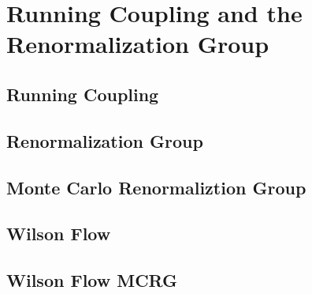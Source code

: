 \chapter{Running Coupling and the Renormalization Group}
\label{ch:theory}

  \section{Running Coupling}
  \label{sec:rc}
  

  \section{Renormalization Group}
  \label{sec:rg}
  

  \section{Monte Carlo Renormaliztion Group}
  \label{sec:mcrg}
  

  \section{Wilson Flow}
  \label{sec:wflow}
  

  \section{Wilson Flow MCRG}
  \label{sec:wflow-mcrg}
  
